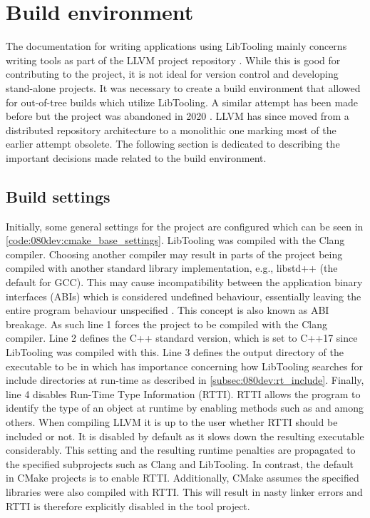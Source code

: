 \section{Build environment} \label{sec:080dev:build_env}

The documentation for writing applications using LibTooling mainly concerns writing tools as part of the LLVM project repository \cite{clangMatchingClangAST, clangClangTransformerTutorial}. While this is good for contributing to the project, it is not ideal for version control and developing stand-alone projects.
It was necessary to create a build environment that allowed for out-of-tree builds which utilize LibTooling. A similar attempt has been made before but the project was abandoned in 2020 \cite{kasmisClangOutoftreeBuild2023}. LLVM has since moved from a distributed repository architecture to a monolithic one marking most of the earlier attempt obsolete.
The following section is dedicated to describing the important decisions made related to the build environment.

\subsection{Build settings}

Initially, some general settings for the project are configured which can be seen in \cref{code:080dev:cmake_base_settings}. LibTooling was compiled with the Clang compiler.
Choosing another compiler may result in parts of the project being compiled with another standard library implementation, e.g., libstd++ (the default for GCC). This may cause incompatibility between the application binary interfaces (ABIs) which is considered undefined behaviour, essentially leaving the entire program behaviour unspecified \cite{cppreferenceUndefinedBehaviorCppreference}. This concept is also known as ABI breakage.
As such line 1 forces the project to be compiled with the Clang compiler.
Line 2 defines the C++ standard version, which is set to C++17 since LibTooling was compiled with this.
Line 3 defines the output directory of the executable to be in  which has importance concerning how LibTooling searches for include directories at run-time as described in \cref{subsec:080dev:rt_include}.
Finally, line 4 disables Run-Time Type Information (RTTI). RTTI allows the program to identify the type of an object at runtime by enabling methods such as  and  among others. When compiling LLVM it is up to the user whether RTTI should be included or not. It is disabled by default as it slows down the resulting executable considerably. This setting and the resulting runtime penalties are propagated to the specified subprojects such as Clang and LibTooling. In contrast, the default in CMake projects is to enable RTTI. Additionally, CMake assumes the specified libraries were also compiled with RTTI. This will result in nasty linker errors and RTTI is therefore explicitly disabled in the tool project.

